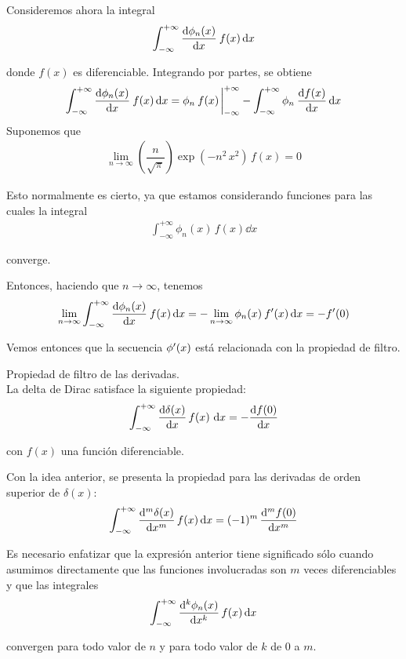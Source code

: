 Consideremos ahora la integral
\begin{align*}
\int_{-\infty}^{+\infty} \dv{\phi_{n}(x)}{x} \: f(x) \dd{x}
\end{align*}

donde $f(x)$ es diferenciable. Integrando por partes, se obtiene
\begin{align*}
\int_{-\infty}^{+\infty} \dv{\phi_{n}(x)}{x} \: f(x) \dd{x} = \phi_{n} \: f(x) \eval_{-\infty}^{+\infty} - \int_{-\infty}^{+\infty} \phi_{n} \: \dv{f(x)}{x} \dd{x}
\end{align*}
Suponemos que
\begin{align*}
\lim_{n \to \infty} \left( \dfrac{n}{\sqrt{\pi}} \right) \exp(-n^{2} \, x^{2}) \, f(x) = 0
\end{align*}

Esto normalmente es cierto, ya que estamos considerando funciones para las cuales la integral
\begin{align*}
\int_{-\infty}^{+\infty} \phi_{n}(x) \, f(x) \dd{x} 
\end{align*}

converge.
\par
Entonces, haciendo que $n \to \infty$, tenemos
\begin{align*}
\lim_{n \to \infty} \int_{-\infty}^{+\infty} \dv{\phi_{n}(x)}{x} \: f(x) \dd{x} = - \lim_{n \to \infty} \phi_{n}(x) \: {f}^{\prime} (x) \dd{x} =  - {f}^{\prime}(0)
\end{align*}

Vemos entonces que la secuencia ${\phi}^{\prime}(x)$ está relacionada con la propiedad de filtro.

\begin{propiedad}
Propiedad de filtro de las derivadas.
\\
La delta de Dirac satisface la siguiente propiedad:
\begin{align*}
\int_{-\infty}^{+\infty} \dv{\delta(x)}{x} \, f(x) \, \dd{x} = - \dv{f(0)}{x}
\end{align*}

con $f(x)$ una función diferenciable.
\par
Con la idea anterior, se presenta la propiedad para las derivadas de orden superior de $\delta (x)$:
\begin{align*}
\int_{-\infty}^{+\infty} \dv[m]{\delta (x)}{x} \, f(x) \dd{x} =  (-1)^{m} \, \dv[m]{f(0)}{x}
\end{align*}

Es necesario enfatizar que la expresión anterior tiene significado sólo cuando asumimos directamente que las funciones involucradas son $m$ veces diferenciables y que las integrales
\begin{align*}
\int_{-\infty}^{+\infty} \dv[k]{\phi_{n}(x)}{x} \, f(x) \dd{x}
\end{align*}

convergen para todo valor de $n$ y para todo valor de $k$ de $0$ a $m$.
\end{propiedad}

